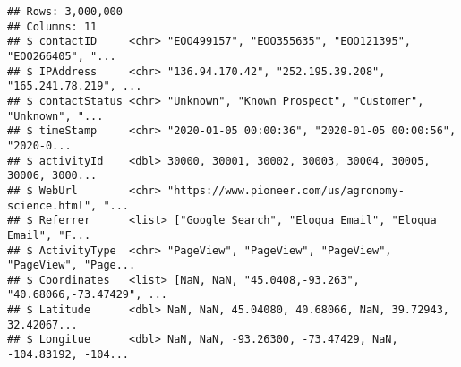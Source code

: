 \documentclass[
]{article}
\newenvironment{Shaded}{\begin{snugshade}}{\end{snugshade}}
\newcommand{\KeywordTok}[1]{\textcolor[rgb]{0.13,0.29,0.53}{\textbf{#1}}}
\newcommand{\NormalTok}[1]{#1}
\newcommand{\OperatorTok}[1]{\textcolor[rgb]{0.81,0.36,0.00}{\textbf{#1}}}
\newcommand{\StringTok}[1]{\textcolor[rgb]{0.31,0.60,0.02}{#1}}
\begin{document}
\begin{Shaded}
\end{Shaded}

\begin{verbatim}
## Rows: 3,000,000
## Columns: 11
## $ contactID     <chr> "EOO499157", "EOO355635", "EOO121395", "EOO266405", "...
## $ IPAddress     <chr> "136.94.170.42", "252.195.39.208", "165.241.78.219", ...
## $ contactStatus <chr> "Unknown", "Known Prospect", "Customer", "Unknown", "...
## $ timeStamp     <chr> "2020-01-05 00:00:36", "2020-01-05 00:00:56", "2020-0...
## $ activityId    <dbl> 30000, 30001, 30002, 30003, 30004, 30005, 30006, 3000...
## $ WebUrl        <chr> "https://www.pioneer.com/us/agronomy-science.html", "...
## $ Referrer      <list> ["Google Search", "Eloqua Email", "Eloqua Email", "F...
## $ ActivityType  <chr> "PageView", "PageView", "PageView", "PageView", "Page...
## $ Coordinates   <list> [NaN, NaN, "45.0408,-93.263", "40.68066,-73.47429", ...
## $ Latitude      <dbl> NaN, NaN, 45.04080, 40.68066, NaN, 39.72943, 32.42067...
## $ Longitue      <dbl> NaN, NaN, -93.26300, -73.47429, NaN, -104.83192, -104...
\end{verbatim}
\end{document}
